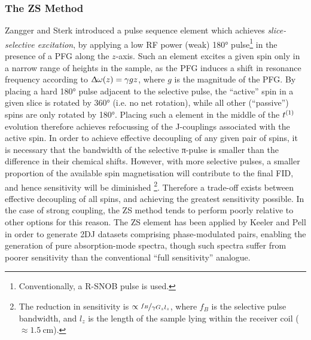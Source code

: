 \subsubsection{The \acl{ZS} Method}
\label{subsec:ZS}
Zangger and Sterk introduced a pulse sequence element which achieves
\emph{slice-selective excitation}, by applying a low \ac{RF} power (weak) \ang{180}
pulse\footnote{Conventionally, a R-SNOB pulse is used\cite{Kupce1995}.} in the
presence of a \ac{PFG} along the $z$-axis\cite{Zangger1997}. Such an element
excites a
given spin only in a narrow range of heights in the sample, as the \ac{PFG}
induces a shift in resonance frequency according to $\Updelta \omega(z) = \gamma
gz$, where $g$ is the magnitude of the \ac{PFG}. By placing a hard
\ang{180} pulse adjacent to the selective pulse, the
``active'' spin in a given slice is rotated by \ang{360} (i.e. no net
rotation), while all other (``passive'') spins are only rotated by \ang{180}.
Placing such a element in the middle of the $t^{(1)}$ evolution therefore
achieves refocussing of the J-couplings associated with the active
spin\cite{Aguilar2010}. In order to achieve effective decoupling of any given
pair of spins, it is necessary that the bandwidth of the selective π-pulse is
smaller than the difference in their chemical shifts. However, with more
selective pulses, a smaller proportion of the available spin magnetisation will
contribute to the final FID, and hence sensitivity will be diminished
\footnote{
    The reduction in sensitivity is $\propto \nicefrac{f_B}{\gamma G_z l_z}$,
    where $f_B$ is the selective pulse bandwidth, and $l_z$ is the length of
    the sample lying within the receiver coil ($\approx
    \qty{1.5}{\centi\meter}$).
}.
Therefore a trade-off exists between effective decoupling of all spins, and
achieving the greatest sensitivity possible. In the case of strong coupling,
the \ac{ZS} method tends to perform poorly relative to other options for this
reason. The \ac{ZS} element has been applied by Keeler and Pell in order to
generate \ac{2DJ} datasets comprising phase-modulated pairs, enabling the
generation of pure absorption-mode spectra\cite{Pell2007}, though such spectra suffer from poorer sensitivity than the conventional ``full sensitivity'' analogue.

